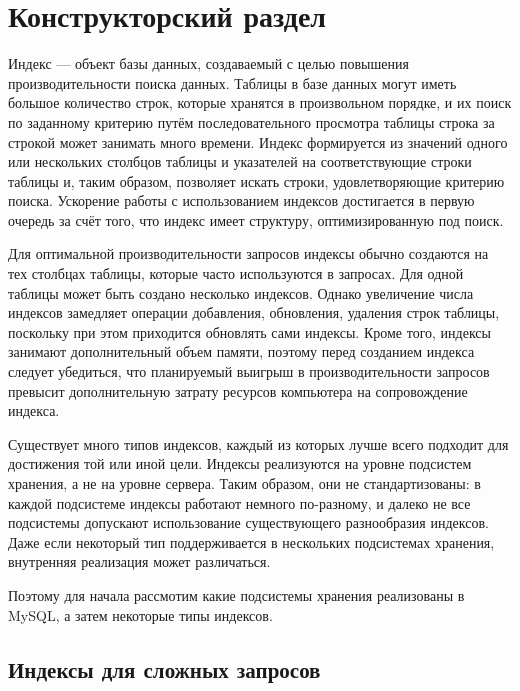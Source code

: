 \chapter{Конструкторский раздел}

Индекс — объект базы данных, создаваемый с целью повышения производительности поиска данных. Таблицы в базе данных могут иметь большое количество строк, которые хранятся в произвольном порядке, и их поиск по заданному критерию путём последовательного просмотра таблицы строка за строкой может занимать много времени. Индекс формируется из значений одного или нескольких столбцов таблицы и указателей на соответствующие строки таблицы и, таким образом, позволяет искать строки, удовлетворяющие критерию поиска. Ускорение работы с использованием индексов достигается в первую очередь за счёт того, что индекс имеет структуру, оптимизированную под поиск.

Для оптимальной производительности запросов индексы обычно создаются на тех столбцах таблицы, которые часто используются в запросах. Для одной таблицы может быть создано несколько индексов. Однако увеличение числа индексов замедляет операции добавления, обновления, удаления строк таблицы, поскольку при этом приходится обновлять сами индексы. Кроме того, индексы занимают дополнительный объем памяти, поэтому перед созданием индекса следует убедиться, что планируемый выигрыш в производительности запросов превысит дополнительную затрату ресурсов компьютера на сопровождение индекса. \cite{wikipedia.org:index}

Существует много типов индексов, каждый из которых лучше всего подходит для достижения той или иной цели. Индексы реализуются на уровне подсистем хранения, а не на уровне сервера. Таким образом, они не стандартизованы: в каждой подсистеме индексы работают немного по-разному, и далеко не все подсистемы допускают использование существующего разнообразия индексов. Даже если некоторый тип поддерживается в нескольких подсистемах хранения, внутренняя реализация может различаться. \cite{zaitsev} 

Поэтому для начала рассмотим какие подсистемы хранения реализованы в MySQL,
 а затем некоторые типы индексов.  











\section{Индексы для сложных запросов}


